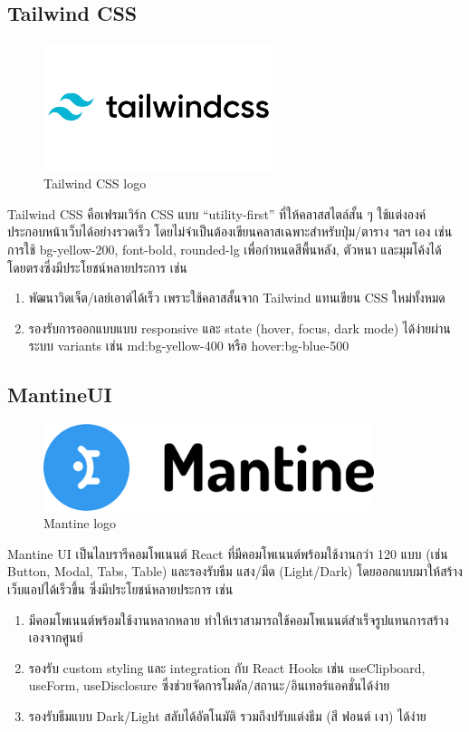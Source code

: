   \subsection{Tailwind CSS}
      \begin{figure}[!h]
      \centering
      \includegraphics[width=0.6\textwidth]{image/Background/tailwind-overview.png}
      \caption{ Tailwind CSS logo}
      \label{fig:tailwind}
    \end{figure}
    \qquad Tailwind CSS คือเฟรมเวิร์ก CSS แบบ “utility-first” ที่ให้คลาสสไตล์สั้น ๆ ใช้แต่งองค์ประกอบหน้าเว็บได้อย่างรวดเร็ว โดยไม่จำเป็นต้องเขียนคลาสเฉพาะสำหรับปุ่ม/ตาราง ฯลฯ เอง เช่น การใช้ bg-yellow-200, font-bold, rounded-lg เพื่อกำหนดสีพื้นหลัง, ตัวหนา และมุมโค้งได้โดยตรงซึ่งมีประโยชน์หลายประการ เช่น \cite{Tailwind}
     \begin{enumerate}
      \item พัฒนาวิดเจ็ต/เลย์เอาต์ได้เร็ว เพราะใช้คลาสสั้นจาก Tailwind แทนเขียน CSS ใหม่ทั้งหมด
      \item รองรับการออกแบบแบบ responsive และ state (hover, focus, dark mode) ได้ง่ายผ่านระบบ variants เช่น md:bg-yellow-400 หรือ hover:bg-blue-500
    \end{enumerate}

  \subsection{MantineUI}
  \begin{figure}[!h]
    \centering
    \includegraphics[width=0.86\textwidth]{Image/Background/mantine.png}
    \caption{Mantine logo}
  \label{fig:mantine}
  \end{figure}
    \qquad Mantine UI เป็นไลบรารีคอมโพเนนต์ React ที่มีคอมโพเนนต์พร้อมใช้งานกว่า 120 แบบ (เช่น Button, Modal, Tabs, Table) และรองรับธีม แสง/มืด (Light/Dark) โดยออกแบบมาให้สร้างเว็บแอปได้เร็วขึ้น ซึ่งมีประโยชน์หลายประการ เช่น \cite{Mantine}
 \begin{enumerate}
      \item มีคอมโพเนนต์พร้อมใช้งานหลากหลาย ทำให้เราสามารถใช้คอมโพเนนต์สำเร็จรูปแทนการสร้างเองจากศูนย์
      \item รองรับ custom styling และ integration กับ React Hooks เช่น useClipboard, useForm, useDisclosure ซึ่งช่วยจัดการโมดัล/สถานะ/อินเทอร์แอคชั่นได้ง่าย
      \item รองรับธีมแบบ Dark/Light สลับได้อัตโนมัติ รวมถึงปรับแต่งธีม (สี ฟอนต์ เงา) ได้ง่าย
    \end{enumerate}

